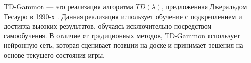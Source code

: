 TD-Gammon --- это реализация алгоритма $TD(\lambda)$, предложенная Джеральдом Тесауро в 1990-х \cite{td-gammon}. Данная реализация использует обучение с подкреплением и достигла высоких результатов, обучаясь исключительно посредством самообучения. В отличие от традиционных методов, TD-Gammon использует нейронную сеть, которая оценивает позиции на доске и принимает решения на основе текущего состояния игры.
